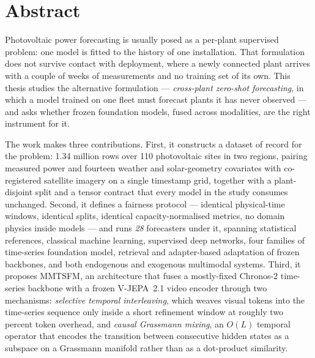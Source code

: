 \chapter*{Abstract} %
\label{abtract}


Photovoltaic power forecasting is usually posed as a per-plant supervised problem: one
model is fitted to the history of one installation. That formulation does not survive
contact with deployment, where a newly connected plant arrives with a couple of weeks of
measurements and no training set of its own. This thesis studies the alternative
formulation --- \emph{cross-plant zero-shot forecasting}, in which a model trained on one
fleet must forecast plants it has never observed --- and asks whether frozen foundation
models, fused across modalities, are the right instrument for it.

The work makes three contributions. First, it constructs a dataset of record for the
problem: 1.34 million rows over 110 photovoltaic sites in two regions, pairing measured
power and fourteen weather and solar-geometry covariates with co-registered satellite
imagery on a single timestamp grid, together with a plant-disjoint split and a tensor
contract that every model in the study consumes unchanged. Second, it defines a fairness
protocol --- identical physical-time windows, identical splits, identical
capacity-normalised metrics, no domain physics inside models --- and runs \emph{28}
forecasters under it, spanning statistical references, classical machine learning,
supervised deep networks, four families of time-series foundation model, retrieval and
adapter-based adaptation of frozen backbones, and both endogenous and exogenous multimodal
systems. Third, it proposes MMTSFM, an architecture that fuses a mostly-fixed Chronos-2
time-series backbone with a frozen V-JEPA~2.1 video encoder through two mechanisms:
\emph{selective temporal interleaving}, which weaves visual tokens into the time-series
sequence only inside a short refinement window at roughly two percent token overhead, and
\emph{causal Grassmann mixing}, an $O(L)$ temporal operator that encodes the transition
between consecutive hidden states as a subspace on a Grassmann manifold rather than as a
dot-product similarity.

